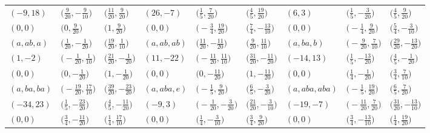 \documentclass[pdftex]{sigma}
\theoremstyle{definition}
\numberwithin{equation}{section}
\begin{document}
\begin{landscape}
\begin{table}[th]
\begin{tabular}{|lll|lll|lll|}
\\
$(-9, 18)$ & $\bigl(\frac{9}{20}, -\frac{9}{10}\bigr)$ & $\bigl(\frac{11}{20}, \frac{9}{20}\bigr)$ & $(26, -7)$ & $\bigl(\frac{1}{5}, \frac{7}{20}\bigr)$ & $\bigl(\frac{4}{5}, \frac{19}{20}\bigr)$ & $(6, 3)$ & $\bigl(\frac{1}{5}, -\frac{3}{20}\bigr)$ & $\bigl(\frac{4}{5}, \frac{9}{20}\bigr)$
\\
$(0, 0)$ & $\bigl(0, \frac{9}{20}\bigr)$ & $\bigl(1, \frac{9}{20}\bigr)$ & $(0, 0)$ & $\bigl(-\frac{3}{4}, \frac{19}{20}\bigr)$ & $\bigl(\frac{7}{4}, -\frac{13}{10}\bigr)$ & $(0, 0)$ & $\bigl(-\frac{1}{4}, \frac{9}{20}\bigr)$ & $\bigl(\frac{5}{4}, -\frac{3}{10}\bigr)$
\\\hline
$(a, ab, a)$ & $\bigl(\frac{1}{20}, -\frac{1}{20}\bigr)$ & $\bigl(\frac{19}{20}, \frac{1}{10}\bigr)$ & $(a, ab, ab)$ & $\bigl(\frac{11}{20}, -\frac{11}{20}\bigr)$ & $\bigl(\frac{9}{20}, \frac{11}{10}\bigr)$ & $(a, ba, b)$ & $\bigl(-\frac{9}{20}, \frac{7}{10}\bigr)$ & $\bigl(\frac{29}{20}, -\frac{13}{20}\bigr)$ \\
$(1, -2)$ & $\bigl(-\frac{1}{20}, \frac{1}{10}\bigr)$ & $\bigl(\frac{21}{20}, -\frac{1}{20}\bigr)$ & $(11, -22)$ & $\bigl(-\frac{11}{20}, \frac{11}{10}\bigr)$ & $\bigl(\frac{31}{20}, -\frac{11}{20}\bigr)$ & $(-14, 13)$ & $\bigl(\frac{1}{5}, -\frac{13}{20}\bigr)$ & $\bigl(\frac{4}{5}, -\frac{1}{20}\bigr)$
\\
$(0, 0)$ & $\bigl(0, -\frac{1}{20}\bigr)$ & $\bigl(1, -\frac{1}{20}\bigr)$ & $(0, 0)$ & $\bigl(0, -\frac{11}{20}\bigr)$ & $\bigl(1, -\frac{11}{20}\bigr)$ & $(0, 0)$ & $\bigl(\frac{1}{4}, -\frac{1}{20}\bigr)$ & $\bigl(\frac{3}{4}, \frac{7}{10}\bigr)$
\\\hline
$(a, ba, ba)$ & $\bigl(-\frac{19}{20}, \frac{17}{10}\bigr)$ & $\bigl(\frac{39}{20}, -\frac{23}{20}\bigr)$ & $(a, aba, e)$ & $\bigl(-\frac{1}{5}, \frac{9}{20}\bigr)$ & $\bigl(\frac{6}{5}, -\frac{3}{20}\bigr)$ & $(a, aba, aba)$ & $\bigl(-\frac{1}{5}, \frac{19}{20}\bigr)$ & $\bigl(\frac{6}{5}, \frac{7}{20}\bigr)$
\\
$(-34, 23)$ & $\bigl(\frac{1}{5}, -\frac{23}{20}\bigr)$ & $\bigl(\frac{4}{5}, -\frac{11}{20}\bigr)$ & $(-9, 3)$ & $\bigl(-\frac{1}{20}, -\frac{3}{20}\bigr)$ & $\bigl(\frac{21}{20}, -\frac{3}{10}\bigr)$ & $(-19, -7)$ & $\bigl(-\frac{11}{20}, \frac{7}{20}\bigr)$ & $\bigl(\frac{31}{20}, -\frac{13}{10}\bigr)$
\\
$(0, 0)$ & $\bigl(\frac{3}{4}, -\frac{11}{20}\bigr)$ & $\bigl(\frac{1}{4}, \frac{17}{10}\bigr)$ & $(0, 0)$ & $\bigl(\frac{1}{4}, -\frac{3}{10}\bigr)$ & $\bigl(\frac{3}{4}, \frac{9}{20}\bigr)$ & $(0, 0)$ & $\bigl(\frac{3}{4}, -\frac{13}{10}\bigr)$ & $\bigl(\frac{1}{4}, \frac{19}{20}\bigr)$

\end{tabular}
\end{table}
\end{landscape}
\end{document}
